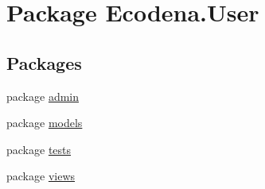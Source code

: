\hypertarget{namespace_ecodena_1_1_user}{
\section{Package Ecodena.User}
\label{d3/d20/namespace_ecodena_1_1_user}
}
\subsection*{Packages}
\begin{DoxyCompactItemize}
\item 
package \hyperlink{namespace_ecodena_1_1_user_1_1admin}{admin}
\item 
package \hyperlink{namespace_ecodena_1_1_user_1_1models}{models}
\item 
package \hyperlink{namespace_ecodena_1_1_user_1_1tests}{tests}
\item 
package \hyperlink{namespace_ecodena_1_1_user_1_1views}{views}
\end{DoxyCompactItemize}
